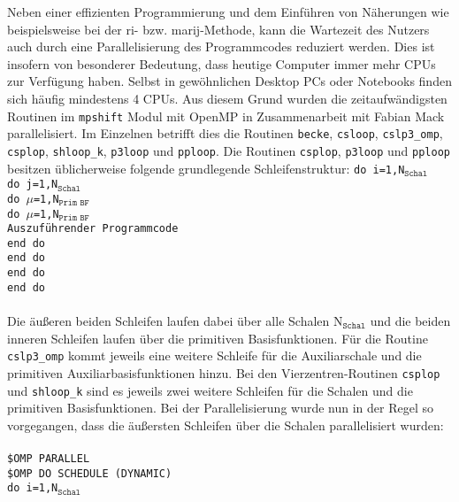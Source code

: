 \bigskip
Neben einer effizienten Programmierung und dem Einführen von Näherungen wie beispielsweise bei der \ac{ri}- bzw. \ac{marij}-Methode, kann die Wartezeit des Nutzers auch durch eine Parallelisierung des Programmcodes reduziert werden. Dies ist insofern von besonderer Bedeutung, dass heutige Computer immer mehr CPUs zur Verfügung haben. Selbst in gewöhnlichen Desktop PCs oder Notebooks finden sich häufig mindestens 4 CPUs. Aus diesem Grund wurden die zeitaufwändigsten Routinen im \texttt{mpshift} Modul mit OpenMP\supercite{dagum1998openmp} in Zusammenarbeit mit Fabian Mack parallelisiert. Im Einzelnen betrifft dies die Routinen \texttt{becke}, \texttt{csloop}, \texttt{cslp3\_omp}, \texttt{csplop}, \texttt{shloop\_k}, \texttt{p3loop} und \texttt{pploop}. Die Routinen \texttt{csplop}, \texttt{p3loop} und \texttt{pploop} besitzen üblicherweise folgende grundlegende Schleifenstruktur:
\vfill
\newpage
\texttt{do i=1,N$_{\texttt{Schal}}$}\\ 
\null\quad\texttt{do j=1,N$_{\texttt{Schal}}$}\\ 
\null\quad\quad\texttt{do $\mu$=1,N$_{\texttt{Prim BF}}$}\\ 
\null\quad\quad\quad\texttt{do $\mu$=1,N$_{\texttt{Prim BF}}$}\\
\null\quad\quad\quad\quad \texttt{Auszuführender Programmcode}\\ 
\null\quad\quad\quad\texttt{end do}\\ 
\null\quad\quad\texttt{end do}\\ 
\null\quad\texttt{end do}\\ 
\texttt{end do}\\
\\
Die äußeren beiden Schleifen laufen dabei über alle Schalen N$_{\texttt{Schal}}$ und die beiden inneren Schleifen laufen über die primitiven Basisfunktionen. Für die Routine \texttt{cslp3\_omp} kommt jeweils eine weitere Schleife für die Auxiliarschale und die primitiven Auxiliarbasisfunktionen hinzu. Bei den Vierzentren-Routinen \texttt{csplop} und \texttt{shloop\_k} sind es jeweils zwei weitere Schleifen für die Schalen und die primitiven Basisfunktionen. Bei der Parallelisierung wurde nun in der Regel so vorgegangen, dass die äußersten Schleifen über die Schalen parallelisiert wurden:\\
\\
\texttt{\$OMP PARALLEL}\\
\texttt{\$OMP DO SCHEDULE (DYNAMIC)}\\
\texttt{do i=1,N$_{\texttt{Schal}}$}\\ 
